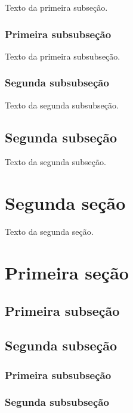 \documentclass[a4paper,12pt,oneside,onecolumn]{uerj}
\begin{document}
Texto da primeira subseção.

\subsubsection{Primeira subsubseção}

Texto da primeira subsubseção.

\subsubsection{Segunda subsubseção}

Texto da segunda subsubseção.

\subsection{Segunda subseção}

Texto da segunda subseção.

\section{Segunda seção}

Texto da segunda seção.


\section{Primeira seção}

\subsection{Primeira subseção}

\subsection{Segunda subseção}

\subsubsection{Primeira subsubseção}

\subsubsection{Segunda subsubseção}
\end{document}
